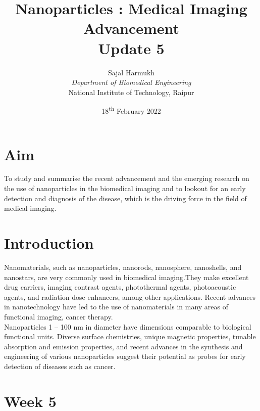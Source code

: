 \documentclass{article}
\title{\textbf{Nanoparticles : Medical Imaging Advancement\\Update 5}}
\author{Sajal Harmukh \\ \textit{Department of Biomedical Engineering} \\ National Institute of Technology, Raipur }
\date{18\textsuperscript{th} February 2022}
\begin{document}
\maketitle

\section*{Aim}
\large
To study and summarise the recent advancement and the emerging research on the use of nanoparticles in the biomedical imaging and to lookout for an early detection and diagnosis of the disease, which is the driving force in the field of medical imaging.

\section*{Introduction}
Nanomaterials, such as nanoparticles, nanorods, nanosphere, nanoshells, and nanostars, are
very commonly used in biomedical imaging.They make excellent drug carriers, imaging contrast agents, photothermal agents, photoacoustic agents, and radiation dose enhancers, among other applications. Recent advances in nanotechnology have led to the use of nanomaterials
in many areas of functional imaging, cancer therapy.\\ Nanoparticles 1 – 100 nm in diameter have dimensions comparable to biological functional units. Diverse surface chemistries, unique magnetic properties, tunable absorption and emission properties, and recent advances in the synthesis and engineering of various nanoparticles suggest their potential as probes for early detection of diseases such as cancer.
 


\section*{Week 5 }
\end{document}

